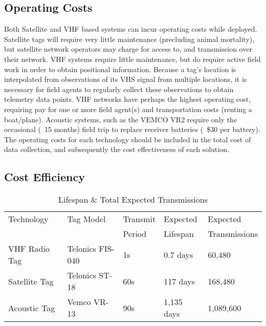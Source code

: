 \subsection{Operating Costs}
Both Satellite and VHF based systems can incur operating costs while deployed.  Satellite tags will require very little maintenance (precluding animal mortality), but satellite network operators may charge for access to, and transmission over their network\cite{wildlifetracking}.  VHF systems require little maintenance, but do require active field work in order to obtain positional information.  Because a tag's location is interpolated from observations of its VHS signal from multiple locations, it is necessary for field agents to regularly collect these observations to obtain telemetry data points.  VHF networks have perhaps the highest operating cost, requiring pay for one or more field agent(s) and transportation costs (renting a boat/plane).  Acoustic systems, such as the VEMCO VR2 require only the occasional (~15 months) field trip  to replace receiver batteries (~\$30 per battery).  The operating costs for each technology should be included in the total cost of data collection, and subsequently the cost effectiveness of each solution.
  
  


\subsection{Cost Efficiency}
\begin{table}[ht]
	\begin{tabular}{l l l l l}
		Technology&Tag Model&Transmit&Expected&Expected \\
		&& Period&Lifespan&Transmissions\\
		\hline
		VHF Radio Tag		& Telonics FIS-040	& 1s	& 0.7 days	    & 60,480\\
		Satellite Tag		& Telonics ST-18	& 60s	& 117 days		& 168,480\\
		Acoustic Tag		& Vemco VR-13		& 90s	& 1,135 days	& 1,089,600\\
	\end{tabular}
\caption{Lifespan \& Total Expected Transmissions
	\label{ExpectedLife&Tx}}
\end{table}



